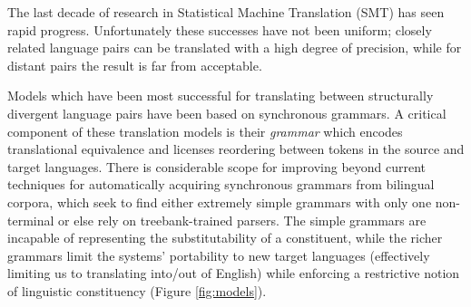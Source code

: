 \documentclass[11pt]{article}
\begin{document}
The last decade of research in Statistical Machine Translation (SMT) has seen rapid progress. %
Unfortunately these successes have not been uniform; 
closely related language pairs 
can be translated with a high degree of precision, while for distant pairs 
the result is far from acceptable. 

Models which have been most successful for translating between structurally divergent language pairs have been based on synchronous grammars. 
A critical component of these translation models is their \emph{grammar} which encodes translational equivalence and licenses reordering between tokens in the source and target languages. 
There is considerable scope for improving beyond current techniques for automatically acquiring synchronous grammars from bilingual corpora, which seek to find either extremely simple grammars with only one non-terminal or else rely on treebank-trained parsers.
The simple grammars are incapable of representing the substitutability of a constituent, while the richer grammars limit the systems' portability to new target languages (effectively limiting us to translating into/out of English) while enforcing a restrictive notion of linguistic constituency (Figure \ref{fig:models}). 
\end{document}

